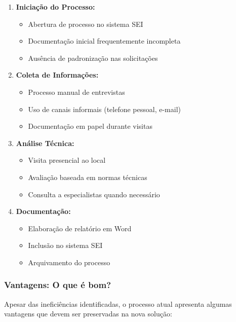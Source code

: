 \documentclass[12pt,a4paper]{article}
\begin{document}
\begin{enumerate}
    \item \textbf{Iniciação do Processo:}
    \begin{itemize}
        \item Abertura de processo no sistema SEI
        \item Documentação inicial frequentemente incompleta
        \item Ausência de padronização nas solicitações
    \end{itemize}
    
    \item \textbf{Coleta de Informações:}
    \begin{itemize}
        \item Processo manual de entrevistas
        \item Uso de canais informais (telefone pessoal, e-mail)
        \item Documentação em papel durante visitas
    \end{itemize}
    
    \item \textbf{Análise Técnica:}
    \begin{itemize}
        \item Visita presencial ao local
        \item Avaliação baseada em normas técnicas
        \item Consulta a especialistas quando necessário
    \end{itemize}
    
    \item \textbf{Documentação:}
    \begin{itemize}
        \item Elaboração de relatório em Word
        \item Inclusão no sistema SEI
        \item Arquivamento do processo
    \end{itemize}
\end{enumerate}

\subsubsection{Vantagens: O que é bom?}
Apesar das ineficiências identificadas, o processo atual apresenta algumas vantagens que devem ser preservadas na nova solução:
\end{document}
